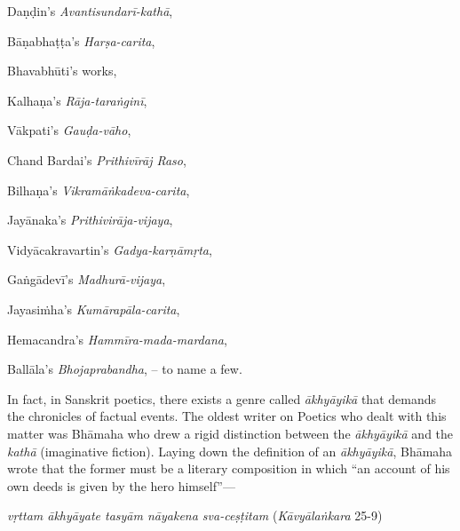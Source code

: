 Daṇḍin’s {\sl Avantisundarī-kathā}, 

Bāṇabhaṭṭa’s {\sl Harṣa-carita},

Bhavabhūti's works,

Kalhaṇa’s {\sl Rāja-taraṅginī}, 

Vākpati’s {\sl Gauḍa-vāho}, 

Chand Bardai’s {\sl Prithivīrāj Raso}, 

Bilhaṇa’s {\sl Vikramāṅkadeva-carita}, 

Jayānaka’s {\sl Prithivirāja-vijaya}, 

Vidyācakravartin’s {\sl Gadya-karṇāmṛta}, 

Gaṅgā\-devī’s {\sl Madhurā-vijaya}, 

Jayasiṁha’s {\sl Kumārapāla-carita}, 

Hemacandra’s {\sl Hammīra-mada-mardana}, 

Ballāla’s {\sl Bhojaprabandha}, -- to name a few. 

In fact, in Sanskrit poetics, there exists a genre called {\sl ākhyāyikā} that demands the chronicles of factual events. The oldest writer on Poetics who dealt with this matter was Bhāmaha who drew a rigid distinction between the {\sl ākhyāyikā} and the {\sl kathā} (imaginative fiction). Laying down the definition of an {\sl ākhyāyikā}, Bhāmaha wrote that the former must be a literary composition in which “an account of his own deeds is given by the hero himself”— 

{\sl vṛttam ākhyāyate tasyām nāyakena sva-ceṣṭitam} 	          \hfill{({\sl Kāvyālaṅkara} 25-9)}

